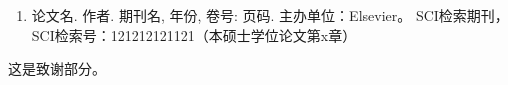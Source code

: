 \documentclass[master]{dutthesis} %
\begin{document}
\begin{Reference}
   
\end{Reference}

\let\cleardoublepage\clearpage

\begin{Publics}
  \begin{enumerate}[1.]
    \item 论文名. 作者. 期刊名, 年份, 卷号: 页码. 主办单位：Elsevier。 SCI检索期刊，SCI检索号：121212121121（本硕士学位论文第x章）
  \end{enumerate}
\end{Publics}

\begin{Acknowledgement}

  这是致谢部分。

\end{Acknowledgement}

\newpage
\printindex %
\authorizationpage
\end{document}
